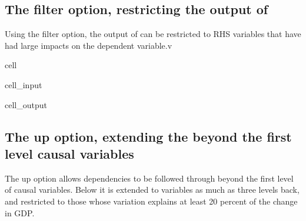 \documentclass[letterpaper,10pt,english]{jupyterBook}
\begin{document}
\subsection{The filter option, restricting the output of }
\label{\detokenize{content/06_ModelAnalytics/ModelStructure:the-filter-option-restricting-the-output-of-tracepre}}
\sphinxAtStartPar
Using the filter option, the output of  can be restricted to RHS variables that have had large impacts on the dependent variable.v

\begin{sphinxuseclass}{cell}\begin{sphinxVerbatimInput}

\begin{sphinxuseclass}{cell_input}
\begin{sphinxVerbatim}[commandchars=\\\{\}]
\end{sphinxVerbatim}

\end{sphinxuseclass}\end{sphinxVerbatimInput}
\begin{sphinxVerbatimOutput}

\begin{sphinxuseclass}{cell_output}
\noindent{}

\end{sphinxuseclass}\end{sphinxVerbatimOutput}

\end{sphinxuseclass}

\subsection{The up option, extending the  beyond the first level causal variables}
\label{\detokenize{content/06_ModelAnalytics/ModelStructure:the-up-option-extending-the-tracepre-beyond-the-first-level-causal-variables}}
\sphinxAtStartPar
The up option allows  dependencies to be followed through beyond the first level of causal variables.  Below it is extended to variables as much as three levels back, and restricted to those whose variation explains at least 20 percent of the change in GDP.
\end{document}
